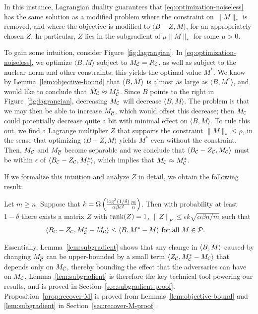 

In this instance, 
Lagrangian duality guarantees that \eqref{eq:optimization-noiseless} has the 
same solution as a modified problem where the constraint on $\|M\|_*$ is removed, 
and where the objective is modified to $\langle B - Z, M \rangle$, for an 
appropriately chosen $Z$. In particular, $Z$ lies in the subgradient of 
$\mu \|M\|_*$ for some $\mu > 0$.

To gain some intuition, consider 
Figure~\ref{fig:lagrangian}. In \eqref{eq:optimization-noiseless}, we optimize 
$\langle B, M \rangle$ subject to $M_{\mathcal{C}} = R_{\mathcal{C}}$, as well as subject to 
the nuclear norm and other constraints; this yields the optimal value $M^*$. 
We know by Lemma~\ref{lem:objective-bound} that $\langle B, \tilde{M} \rangle$ is almost 
as large as $\langle B, M^* \rangle$, and would like to conclude that 
$\tilde{M}_{\mathcal{C}} \approx M^*_{\mathcal{C}}$. Since $B$ points to the right in Figure~\ref{fig:lagrangian}, 
decreasing $M_{\mathcal{C}}$ will decrease $\langle B, M \rangle$. The problem is that 
we may then be able to increase $M_{\overline{\mathcal{C}}}$, which would offset 
this decrease; then $M_{\mathcal{C}}$ could potentially decrease quite a 
bit with minimal effect on $\langle B, M \rangle$. 
To rule this out, we find a Lagrange 
multiplier $Z$ that supports 
the constraint $\|M\|_* \leq \rho$, in the sense that optimizing 
$\langle B-Z, M \rangle$ yields $M^*$ even without the constraint. 
Then, $M_{\mathcal{C}}$ and $M_{\overline{\mathcal{C}}}$ become separable and we conclude that 
$\langle B_{\mathcal{C}} - Z_{\mathcal{C}}, M_{\mathcal{C}} \rangle$ must be within $\epsilon$ of 
$\langle B_{\mathcal{C}} - Z_{\mathcal{C}}, M^*_{\mathcal{C}} \rangle$, which implies that 
$M_{\mathcal{C}} \approx M^*_{\mathcal{C}}$.

If we formalize this intuition and analyze $Z$ in detail, we obtain the 
following result:
\begin{lemma}
\label{lem:subgradient}
Let $m \geq n$. Suppose that $k = \Omega\left( \frac{\log^3(1/\delta)}{\alpha\beta\epsilon^2}\frac{m}{n} \right)$. 
Then with probability at least $1-\delta$ there exists a matrix $Z$ with 
$\operatorname{rank}(Z) = 1$, $\|Z\|_F \leq \epsilon k\sqrt{\alpha\beta n/m}$ such that
\begin{align}
\langle B_{\mathcal{C}} - Z_{\mathcal{C}}, M^*_{\mathcal{C}} - M_{\mathcal{C}} \rangle &\leq \langle B, M^* - M \rangle \text{ for all $M \in \mathcal{P}$}.
\end{align}
\end{lemma}
Essentially, Lemma~\ref{lem:subgradient} shows that any change in 
$\langle B, M \rangle$ caused by changing $M_{\overline{\mathcal{C}}}$ can be upper-bounded 
by a small term $\langle Z_{\mathcal{C}}, M^*_{\mathcal{C}} - M_{\mathcal{C}} \rangle$ that depends only 
on $M_{\mathcal{C}}$, thereby bounding the effect that the adversaries can have 
on $M_{\mathcal{C}}$. Lemma~\ref{lem:subgradient} is therefore the key 
technical tool powering our results, and is proved in 
Section~\ref{sec:subgradient-proof}. Proposition~\ref{prop:recover-M} 
is proved from Lemmas~\ref{lem:objective-bound} and \ref{lem:subgradient} 
in Section~\ref{sec:recover-M-proof}.

